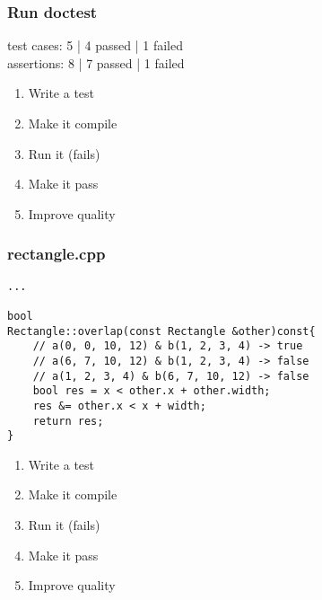 \begin{frame}[fragile]
\frametitle{Run doctest}
\begin{minipage}[t]{0.48\linewidth}
test cases: 5 | 4 passed | 1 failed\\
assertions: 8 | 7 passed | 1 failed\\
\end{minipage}\hfill
\begin{minipage}[t]{0.28\linewidth}
  \small
  \begin{enumerate} 
    \item \textcolor{deadcolor}{Write a test}
    \item \textcolor{deadcolor}{Make it compile}
    \item \textcolor{activecolor}{Run it (fails)}
    \item \textcolor{deadcolor}{Make it pass}
    \item \textcolor{deadcolor}{Improve quality}
  \end{enumerate} 
\end{minipage}
\end{frame}

\begin{frame}[fragile]
\frametitle{rectangle.cpp}
\begin{minipage}[t]{0.48\linewidth}
\begin{lstlisting}
...

bool 
Rectangle::overlap(const Rectangle &other)const{
    // a(0, 0, 10, 12) & b(1, 2, 3, 4) -> true
    // a(6, 7, 10, 12) & b(1, 2, 3, 4) -> false
    // a(1, 2, 3, 4) & b(6, 7, 10, 12) -> false
    bool res = x < other.x + other.width;
    res &= other.x < x + width;
    return res;
}
\end{lstlisting}
\end{minipage}\hfill
\begin{minipage}[t]{0.28\linewidth}
  \small
  \begin{enumerate} 
    \item \textcolor{deadcolor}{Write a test}
    \item \textcolor{deadcolor}{Make it compile}
    \item \textcolor{deadcolor}{Run it (fails)}
    \item \textcolor{activecolor}{Make it pass}
    \item \textcolor{deadcolor}{Improve quality}
  \end{enumerate} 
\end{minipage}
\end{frame}

